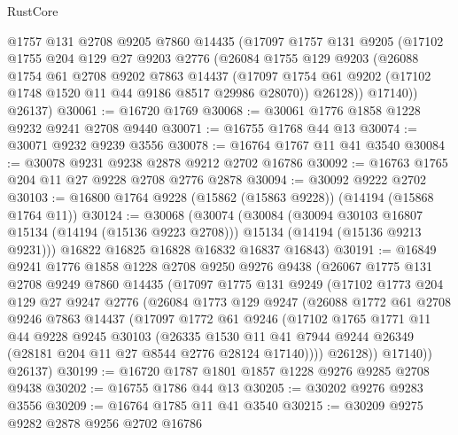 \begin{lexlean}{RustCore}
\begin{coremodule}
      @1757
      @131
      @2708
      @9205
      @7860
      @14435
      (@17097
        @1757
        @131
        @9205
        (@17102
          @1755
          @204
          @129
          @27
          @9203
          @2776
          (@26084
            @1755
            @129
            @9203
            (@26088
              @1754
              @61
              @2708
              @9202
              @7863
              @14437
              (@17097 @1754 @61 @9202 (@17102 @1748 @1520 @11 @44 @9186 @8517 @29986 @28070))
              @26128))
          @17140))
      @26137)
@30061 := @16720 @1769
@30068 := @30061 @1776 @1858 @1228 @9232 @9241 @2708 @9440
@30071 := @16755 @1768 @44 @13
@30074 := @30071 @9232 @9239 @3556
@30078 := @16764 @1767 @11 @41 @3540
@30084 := @30078 @9231 @9238 @2878 @9212 @2702 @16786
@30092 := @16763 @1765 @204 @11 @27 @9228 @2708 @2776 @2878
@30094 := @30092 @9222 @2702
@30103 := @16800 @1764 @9228 (@15862 (@15863 @9228)) (@14194 (@15868 @1764 @11))
@30124 := @30068
    (@30074
      (@30084
        (@30094 @30103 @16807 @15134 (@14194 (@15136 @9223 @2708)))
        @15134
        (@14194 (@15136 @9213 @9231)))
      @16822
      @16825
      @16828
      @16832
      @16837
      @16843)
@30191 := @16849
    @9241
    @1776
    @1858
    @1228
    @2708
    @9250
    @9276
    @9438
    (@26067
      @1775
      @131
      @2708
      @9249
      @7860
      @14435
      (@17097
        @1775
        @131
        @9249
        (@17102
          @1773
          @204
          @129
          @27
          @9247
          @2776
          (@26084
            @1773
            @129
            @9247
            (@26088
              @1772
              @61
              @2708
              @9246
              @7863
              @14437
              (@17097
                @1772
                @61
                @9246
                (@17102
                  @1765
                  @1771
                  @11
                  @44
                  @9228
                  @9245
                  @30103
                  (@26335
                    @1530
                    @11
                    @41
                    @7944
                    @9244
                    @26349
                    (@28181 @204 @11 @27 @8544 @2776 @28124 @17140))))
              @26128))
          @17140))
      @26137)
@30199 := @16720 @1787 @1801 @1857 @1228 @9276 @9285 @2708 @9438
@30202 := @16755 @1786 @44 @13
@30205 := @30202 @9276 @9283 @3556
@30209 := @16764 @1785 @11 @41 @3540
@30215 := @30209 @9275 @9282 @2878 @9256 @2702 @16786

\end{coremodule}
\end{lexlean}
